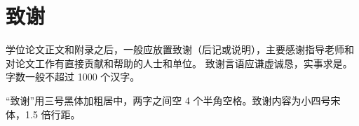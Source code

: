\chapter*{致\hspace{2em}谢}

学位论文正文和附录之后，一般应放置致谢（后记或说明），主要感谢指导老师和对论文工作有直接贡献和帮助的人士和单位。
致谢言语应谦虚诚恳，实事求是。字数一般不超过 1000 个汉字。

“致谢”用三号黑体加粗居中，两字之间空 4 个半角空格。致谢内容为小四号宋体，1.5 倍行距。
